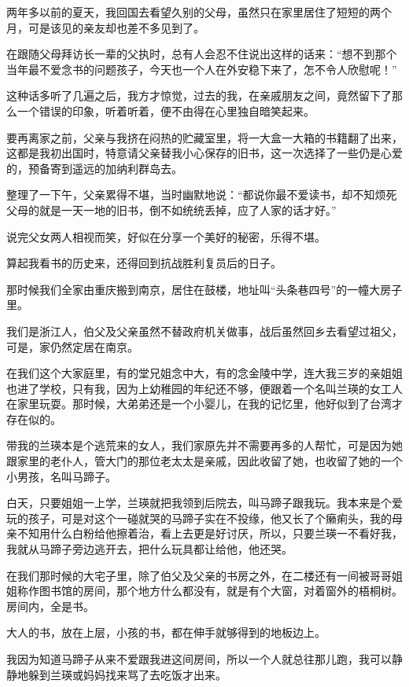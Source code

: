 \par 两年多以前的夏天，我回国去看望久别的父母，虽然只在家里居住了短短的两个月，可是该见的亲友却也差不多见到了。
\par 在跟随父母拜访长一辈的父执时，总有人会忍不住说出这样的话来：“想不到那个当年最不爱念书的问题孩子，今天也一个人在外安稳下来了，怎不令人欣慰呢！”
\par 这种话多听了几遍之后，我方才惊觉，过去的我，在亲戚朋友之间，竟然留下了那么一个错误的印象，听着听着，便不由得在心里独自暗笑起来。
\par 要再离家之前，父亲与我挤在闷热的贮藏室里，将一大盒一大箱的书籍翻了出来，这都是我初出国时，特意请父亲替我小心保存的旧书，这一次选择了一些仍是心爱的，预备寄到遥远的加纳利群岛去。
\par 整理了一下午，父亲累得不堪，当时幽默地说：“都说你最不爱读书，却不知烦死父母的就是一天一地的旧书，倒不如统统丢掉，应了人家的话才好。”
\par 说完父女两人相视而笑，好似在分享一个美好的秘密，乐得不堪。
\par 算起我看书的历史来，还得回到抗战胜利复员后的日子。
\par 那时候我们全家由重庆搬到南京，居住在鼓楼，地址叫“头条巷四号”的一幢大房子里。
\par 我们是浙江人，伯父及父亲虽然不替政府机关做事，战后虽然回乡去看望过祖父，可是，家仍然定居在南京。
\par 在我们这个大家庭里，有的堂兄姐念中大，有的念金陵中学，连大我三岁的亲姐姐也进了学校，只有我，因为上幼稚园的年纪还不够，便跟着一个名叫兰瑛的女工人在家里玩耍。那时候，大弟弟还是一个小婴儿，在我的记忆里，他好似到了台湾才存在似的。
\par 带我的兰瑛本是个逃荒来的女人，我们家原先并不需要再多的人帮忙，可是因为她跟家里的老仆人，管大门的那位老太太是亲戚，因此收留了她，也收留了她的一个小男孩，名叫马蹄子。
\par 白天，只要姐姐一上学，兰瑛就把我领到后院去，叫马蹄子跟我玩。我本来是个爱玩的孩子，可是对这个一碰就哭的马蹄子实在不投缘，他又长了个癞痢头，我的母亲不知用什么白粉给他擦着治，看上去更是好讨厌，所以，只要兰瑛一不看好我，我就从马蹄子旁边逃开去，把什么玩具都让给他，他还哭。
\par 在我们那时候的大宅子里，除了伯父及父亲的书房之外，在二楼还有一间被哥哥姐姐称作图书馆的房间，那个地方什么都没有，就是有个大窗，对着窗外的梧桐树。房间内，全是书。
\par 大人的书，放在上层，小孩的书，都在伸手就够得到的地板边上。
\par 我因为知道马蹄子从来不爱跟我进这间房间，所以一个人就总往那儿跑，我可以静静地躲到兰瑛或妈妈找来骂了去吃饭才出来。

